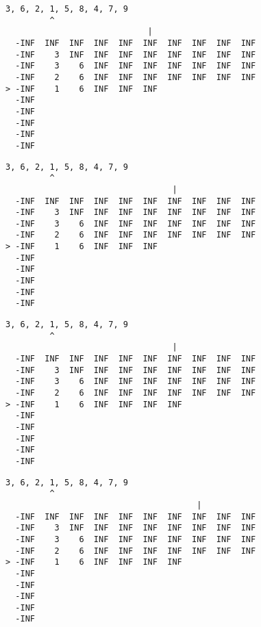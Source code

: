 { \begin{verbatim}
3, 6, 2, 1, 5, 8, 4, 7, 9
         ^
                             |
  -INF  INF  INF  INF  INF  INF  INF  INF  INF  INF
  -INF    3  INF  INF  INF  INF  INF  INF  INF  INF
  -INF    3    6  INF  INF  INF  INF  INF  INF  INF
  -INF    2    6  INF  INF  INF  INF  INF  INF  INF
> -INF    1    6  INF  INF  INF                    
  -INF                                             
  -INF                                             
  -INF                                             
  -INF                                             
  -INF                                             
\end{verbatim} }

{ \begin{verbatim}
3, 6, 2, 1, 5, 8, 4, 7, 9
         ^
                                  |
  -INF  INF  INF  INF  INF  INF  INF  INF  INF  INF
  -INF    3  INF  INF  INF  INF  INF  INF  INF  INF
  -INF    3    6  INF  INF  INF  INF  INF  INF  INF
  -INF    2    6  INF  INF  INF  INF  INF  INF  INF
> -INF    1    6  INF  INF  INF                    
  -INF                                             
  -INF                                             
  -INF                                             
  -INF                                             
  -INF                                             
\end{verbatim} }

{ \begin{verbatim}
3, 6, 2, 1, 5, 8, 4, 7, 9
         ^
                                  |
  -INF  INF  INF  INF  INF  INF  INF  INF  INF  INF
  -INF    3  INF  INF  INF  INF  INF  INF  INF  INF
  -INF    3    6  INF  INF  INF  INF  INF  INF  INF
  -INF    2    6  INF  INF  INF  INF  INF  INF  INF
> -INF    1    6  INF  INF  INF  INF               
  -INF                                             
  -INF                                             
  -INF                                             
  -INF                                             
  -INF                                             
\end{verbatim} }

{ \begin{verbatim}
3, 6, 2, 1, 5, 8, 4, 7, 9
         ^
                                       |
  -INF  INF  INF  INF  INF  INF  INF  INF  INF  INF
  -INF    3  INF  INF  INF  INF  INF  INF  INF  INF
  -INF    3    6  INF  INF  INF  INF  INF  INF  INF
  -INF    2    6  INF  INF  INF  INF  INF  INF  INF
> -INF    1    6  INF  INF  INF  INF               
  -INF                                             
  -INF                                             
  -INF                                             
  -INF                                             
  -INF                                             
\end{verbatim} }

